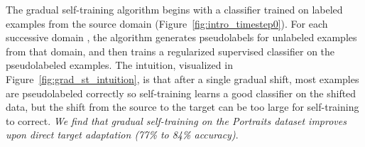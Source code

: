 \documentclass[11pt]{article}
\newcommand{\pl}[1]{}
\begin{document}
\pl{make it clearer that we're proposing this or it has been studied (in which case we need a cite)}
The gradual self-training algorithm begins with a classifier  trained on labeled examples from the source domain (Figure~\ref{fig:intro_timestep0}). For each successive domain , the algorithm generates pseudolabels for unlabeled examples from that domain, and then trains a regularized supervised classifier on the pseudolabeled examples. The intuition, visualized in Figure~\ref{fig:grad_st_intuition}, is that after a single gradual shift, most examples are pseudolabeled correctly so self-training learns a good classifier on the shifted data, but the shift from the source to the target can be too large for self-training to correct. \emph{We find that gradual self-training on the Portraits dataset improves upon direct target adaptation (77\% to 84\% accuracy)}.
\end{document}
